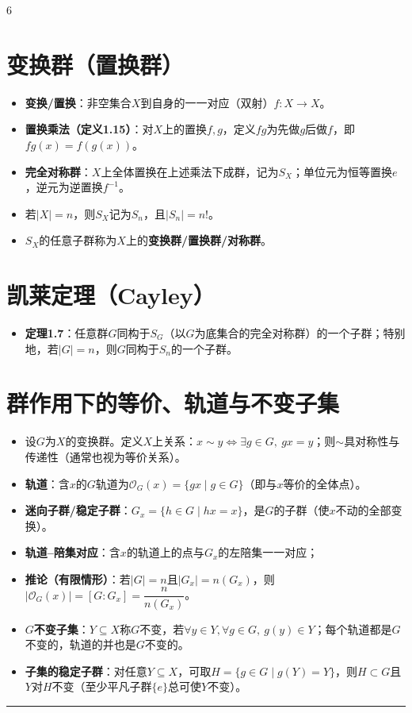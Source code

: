 \documentclass[landscape]{article}
\begin{document}
\begin{multicols*}{6}
\section*{变换群（置换群）}
\begin{itemize}
  \item \textbf{变换/置换}：非空集合$X$到自身的一一对应（双射）$f:X\to X$。
  \item \textbf{置换乘法（定义1.15）}：对$X$上的置换$f,g$，定义$fg$为先做$g$后做$f$，即$fg(x)=f(g(x))$。
  \item \textbf{完全对称群}：$X$上全体置换在上述乘法下成群，记为$S_X$；单位元为恒等置换$e$，逆元为逆置换$f^{-1}$。
  \item 若$|X|=n$，则$S_X$记为$S_n$，且$|S_n|=n!$。
  \item $S_X$的任意子群称为$X$上的\textbf{变换群/置换群/对称群}。
\end{itemize}

\section*{凯莱定理（Cayley）}
\begin{itemize}
  \item \textbf{定理1.7}：任意群$G$同构于$S_G$（以$G$为底集合的完全对称群）的一个子群；特别地，若$|G|=n$，则$G$同构于$S_n$的一个子群。
\end{itemize}

\section*{群作用下的等价、轨道与不变子集}
\begin{itemize}
  \item 设$G$为$X$的变换群。定义$X$上关系：$x\sim y \iff \exists g\in G,\ gx=y$；则$\sim$具对称性与传递性（通常也视为等价关系）。
  \item \textbf{轨道}：含$x$的$G$轨道为$\mathcal{O}_G(x)=\{gx\mid g\in G\}$（即与$x$等价的全体点）。
  \item \textbf{迷向子群/稳定子群}：$G_x=\{h\in G\mid hx=x\}$，是$G$的子群（使$x$不动的全部变换）。
  \item \textbf{轨道--陪集对应}：含$x$的轨道上的点与$G_x$的左陪集一一对应；
  \item \textbf{推论（有限情形）}：若$|G|=n$且$|G_x|=n(G_x)$，则$|\mathcal{O}_G(x)|=[G:G_x]=\dfrac{n}{n(G_x)}$。
  \item \textbf{$G$不变子集}：$Y\subseteq X$称$G$不变，若$\forall y\in Y,\forall g\in G,\ g(y)\in Y$；每个轨道都是$G$不变的，轨道的并也是$G$不变的。
  \item \textbf{子集的稳定子群}：对任意$Y\subseteq X$，可取$H=\{g\in G\mid g(Y)=Y\}$，则$H\subset G$且$Y$对$H$不变（至少平凡子群$\{e\}$总可使$Y$不变）。
\end{itemize}
\noindent\textcolor{red}{\rule{\linewidth}{1pt}}

\end{multicols*}
\end{document}
